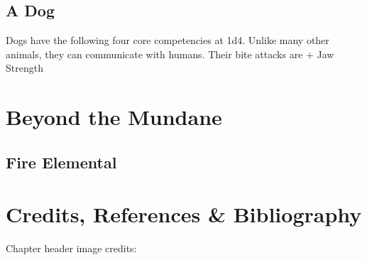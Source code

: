 \subsection{A Dog}
\label{subsec:dog}
Dogs have the following four core competencies at 1d4.
Unlike many other animals, they can communicate with humans.
Their bite attacks are  + Jaw Strength\\


\section{Beyond the Mundane}

\subsection{Fire Elemental}
\label{subsec:fire_elemental}

\section*{Credits, References \& Bibliography}

Chapter header image credits: \cite{squirrel_playing_chess}

\printbibliography[heading=none]

